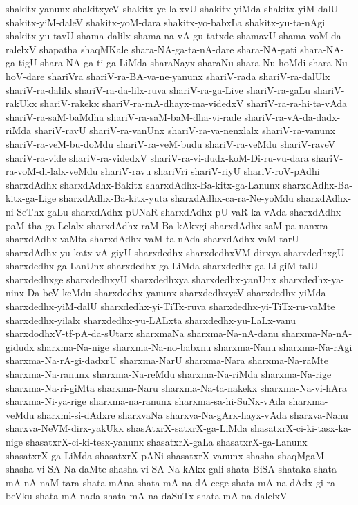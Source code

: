 {shakitx-yanunx
shakitxyeV
shakitx-ye-lalxvU
shakitx-yiMda
shakitx-yiM-dalU
shakitx-yiM-daleV
shakitx-yoM-dara
shakitx-yo-babxLa
shakitx-yu-ta-nAgi
shakitx-yu-tavU
shama-dalilx
shama-na-vA-gu-tatxde
shamavU
shama-voM-da-ralelxV
shapatha
shaqMKale
shara-NA-ga-ta-nA-dare
shara-NA-gati
shara-NA-ga-tigU
shara-NA-ga-ti-ga-LiMda
sharaNayx
sharaNu
shara-Nu-hoMdi
shara-Nu-hoV-dare
shariVra
shariV-ra-BA-va-ne-yanunx
shariV-rada
shariV-ra-dalUlx
shariV-ra-dalilx
shariV-ra-da-lilx-ruva
shariV-ra-ga-Live
shariV-ra-gaLu
shariV-rakUkx
shariV-rakekx
shariV-ra-mA-dhayx-ma-videdxV
shariV-ra-ra-hi-ta-vAda
shariV-ra-saM-baMdha
shariV-ra-saM-baM-dha-vi-rade
shariV-ra-vA-da-dadx-riMda
shariV-ravU
shariV-ra-vanUnx
shariV-ra-va-nenxlalx
shariV-ra-vanunx
shariV-ra-veM-bu-doMdu
shariV-ra-veM-budu
shariV-ra-veMdu
shariV-raveV
shariV-ra-vide
shariV-ra-videdxV
shariV-ra-vi-dudx-koM-Di-ru-vu-dara
shariV-ra-voM-di-lalx-veMdu
shariV-ravu
shariVri
shariV-riyU
shariV-roV-pAdhi
sharxdAdhx
sharxdAdhx-Bakitx
sharxdAdhx-Ba-kitx-ga-Lanunx
sharxdAdhx-Ba-kitx-ga-Lige
sharxdAdhx-Ba-kitx-yuta
sharxdAdhx-ca-ra-Ne-yoMdu
sharxdAdhx-ni-SeThx-gaLu
sharxdAdhx-pUNaR
sharxdAdhx-pU-vaR-ka-vAda
sharxdAdhx-paM-tha-ga-Lelalx
sharxdAdhx-raM-Ba-kAkxgi
sharxdAdhx-saM-pa-nanxra
sharxdAdhx-vaMta
sharxdAdhx-vaM-ta-nAda
sharxdAdhx-vaM-tarU
sharxdAdhx-yu-katx-vA-giyU
sharxdedhx
sharxdedhxVM-dirxya
sharxdedhxgU
sharxdedhx-ga-LanUnx
sharxdedhx-ga-LiMda
sharxdedhx-ga-Li-giM-talU
sharxdedhxge
sharxdedhxyU
sharxdedhxya
sharxdedhx-yanUnx
sharxdedhx-ya-ninx-Da-beV-keMdu
sharxdedhx-yanunx
sharxdedhxyeV
sharxdedhx-yiMda
sharxdedhx-yiM-dalU
sharxdedhx-yi-TiTx-ruva
sharxdedhx-yi-TiTx-ru-vaMte
sharxdedhx-yilalx
sharxdedhx-yu-LALxta
sharxdedhx-yu-LaLx-vanu
sharxdodhxV-tf-pA-da-sUtarx
sharxmaNa
sharxma-Na-nA-danu
sharxma-Na-nA-gidudx
sharxma-Na-nige
sharxma-Na-no-babxnu
sharxma-Nanu
sharxma-Na-rAgi
sharxma-Na-rA-gi-dadxrU
sharxma-NarU
sharxma-Nara
sharxma-Na-raMte
sharxma-Na-ranunx
sharxma-Na-reMdu
sharxma-Na-riMda
sharxma-Na-rige
sharxma-Na-ri-giMta
sharxma-Naru
sharxma-Na-ta-nakekx
sharxma-Na-vi-hAra
sharxma-Ni-ya-rige
sharxma-na-ranunx
sharxma-sa-hi-SuNx-vAda
sharxma-veMdu
sharxmi-si-dAdxre
sharxvaNa
sharxva-Na-gArx-hayx-vAda
sharxva-Nanu
sharxva-NeVM-dirx-yakUkx
shasAtxrX-satxrX-ga-LiMda
shasatxrX-ci-ki-tasx-ka-nige
shasatxrX-ci-ki-tesx-yanunx
shasatxrX-gaLa
shasatxrX-ga-Lanunx
shasatxrX-ga-LiMda
shasatxrX-pANi
shasatxrX-vanunx
shasha-shaqMgaM
shasha-vi-SA-Na-daMte
shasha-vi-SA-Na-kAkx-gali
shata-BiSA
shataka
shata-mA-nA-naM-tara
shata-mAna
shata-mA-na-dA-cege
shata-mA-na-dAdx-gi-ra-beVku
shata-mA-nada
shata-mA-na-daSuTx
shata-mA-na-dalelxV
}
